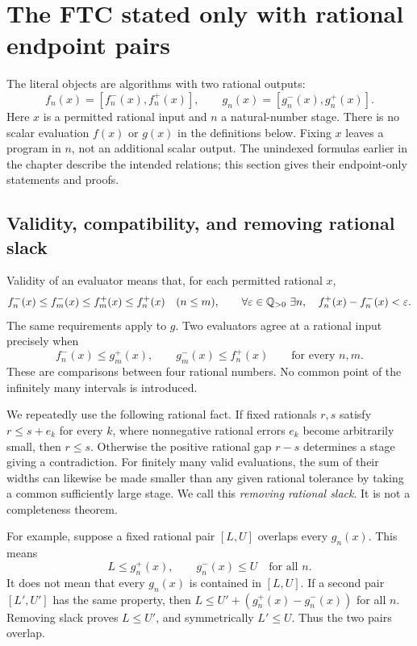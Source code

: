 \section{The FTC stated only with rational endpoint pairs}
\label{sec:ftc-finite-output}

The literal objects are algorithms with two rational outputs:
\[
 f_n(x)=[f_n^-(x),f_n^+(x)],\qquad
 g_n(x)=[g_n^-(x),g_n^+(x)].
\]
Here $x$ is a permitted rational input and $n$ a natural-number stage.
There is no scalar evaluation $f(x)$ or $g(x)$ in the definitions below.
Fixing $x$ leaves a program in $n$, not an additional scalar output.
The unindexed formulas earlier in the chapter describe the intended
relations; this section gives their endpoint-only statements and proofs.

\subsection{Validity, compatibility, and removing rational slack}
Validity of an evaluator means that, for each permitted rational $x$,
\[
 f_n^-(x)\le f_m^-(x)\le f_m^+(x)\le f_n^+(x)\quad(n\le m),
 \qquad
 \forall\varepsilon\in\mathbb{Q}_{>0}\ \exists n,\quad
 f_n^+(x)-f_n^-(x)<\varepsilon.
\]
The same requirements apply to $g$.  Two evaluators agree at a rational
input precisely when
\[
 f_n^-(x)\le g_m^+(x),\qquad
 g_m^-(x)\le f_n^+(x)\qquad\text{for every }n,m.
\]
These are comparisons between four rational numbers.  No common point
of the infinitely many intervals is introduced.

We repeatedly use the following rational fact.  If fixed rationals
$r,s$ satisfy $r\le s+e_k$ for every $k$, where nonnegative rational
errors $e_k$ become arbitrarily small, then $r\le s$.  Otherwise the
positive rational gap $r-s$ determines a stage giving a contradiction.
For finitely many valid evaluations, the sum of their widths can likewise
be made smaller than any given rational tolerance by taking a common
sufficiently large stage.  We call this \emph{removing rational slack}.
It is not a completeness theorem.

For example, suppose a fixed rational pair $[L,U]$ overlaps every
$g_n(x)$.  This means
\[
 L\le g_n^+(x),\qquad g_n^-(x)\le U\quad\text{for all }n.
\]
It does not mean that every $g_n(x)$ is contained in $[L,U]$.
If a second pair $[L',U']$ has the same property, then
$L\le U'+(g_n^+(x)-g_n^-(x))$ for all $n$.  Removing slack proves
$L\le U'$, and symmetrically $L'\le U$.  Thus the two pairs overlap.


